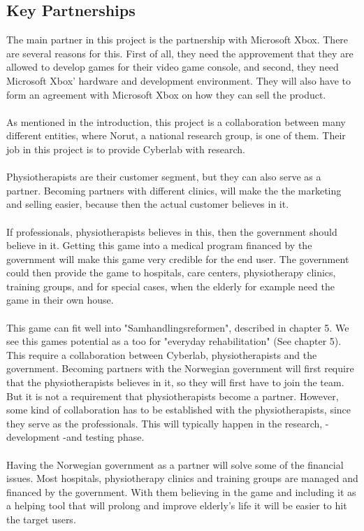 \subsection{Key Partnerships}
The main partner in this project is the partnership with Microsoft Xbox. There are several reasons for this. First of all, they need the approvement that they are allowed to develop games for their video game console, and second, they need Microsoft Xbox’ hardware and development environment. They will also have to form an agreement with Microsoft Xbox on how they can sell the product. \\ \\ As mentioned in the introduction, this project is a collaboration between many different entities, where Norut, a national research group, is one of them. Their job in this project is to provide Cyberlab with research. \\ \\ Physiotherapists are their customer segment, but they can also serve as a partner. Becoming partners with different clinics, will make the the marketing and selling easier, because then the actual customer believes in it. \\ \\ If professionals, physiotherapists believes in this, then the government should believe in it. Getting this game into a medical program financed by the government will make this game very credible for the end user. The government could then provide the game to hospitals, care centers, physiotherapy clinics, training groups, and for special cases, when the elderly for example need the game in their own house. \\ \\ This game can fit well into "Samhandlingsreformen", described in chapter 5. We see this games potential as a too for "everyday rehabilitation" (See chapter 5). This require a collaboration between Cyberlab, physiotherapists and the government. Becoming partners with the Norwegian government will first require that the physiotherapists believes in it, so they will first have to join the team. But it is not a requirement that physiotherapists become a partner. However, some kind of collaboration has to be established with the physiotherapists, since they serve as the professionals. This will typically happen in the research, - development -and testing phase.  \\ \\ Having the Norwegian government as a partner will solve some of the financial issues. Most hospitals, physiotherapy clinics and training groups are managed and financed by the government. With them believing in the game and including it as a helping tool that will prolong and improve elderly's life it will be easier to hit the target users. 
